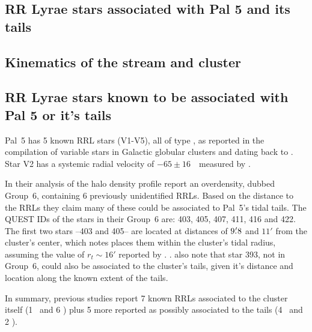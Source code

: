 \documentclass[twocolumn]{aastex63}
\begin{document}
\subsection{RR Lyrae stars associated with Pal 5 and its tails}



\subsection{Kinematics of the stream and cluster}





\subsection{RR Lyrae stars known to be associated with Pal 5 or it's tails}


Pal~5 has 5 known RRL stars (V1-V5), all of type \typec, as reported in the \citet{Clement2001} compilation of variable stars in Galactic globular clusters and dating back to \citet{SawyerHogg1973}. Star V2 has a  systemic radial velocity of  $-65\pm16$~\kms~measured by \citet{Vivas2005}. 

In their analysis of the halo density profile \citet{Vivas2006} report an overdensity, dubbed Group~6, containing 6 previously unidentified RRLs. Based on the distance to the RRLs they claim many of these could be associated to Pal~5's tidal tails. The QUEST IDs of the stars in their Group~6 are: 403, 405, 407, 411, 416 and 422. The first two stars --403 and 405-- are located at distances of  $9\mbox{$.\mkern-4mu^\prime$}8$ and $11'$ from the cluster's center, which \citet{Vivas2004} notes places them within the cluster's tidal radius, assuming the value of $r_t\sim16'$ reported by \citet{Odenkirchen:2002}.  . \citet{Vivas2006} also note that star 393, not in Group~6, could also be associated to the cluster's tails, given it's distance and location along the known extent of the tails.

In summary,  previous studies report 7 known RRLs associated to the cluster itself (1 \typeab~and 6 \typec) plus 5 more reported as possibly associated to the tails (4 \typeab~and 2 \typec). 
\end{document}
